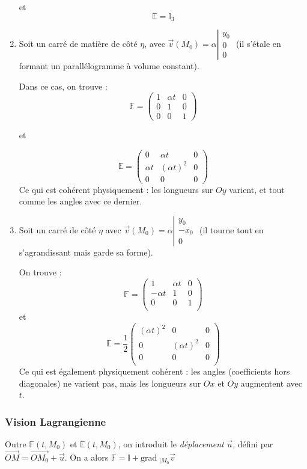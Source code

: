 \documentclass{article}
\newcommand{\grad}{\mathrm{grad}\;}
\begin{document}
\begin{enumerate}
et
\[\mathbb{E} = \mathbb{I}_3\]


\item
Soit un carré de matière de côté $\eta$, avec $\vec{v}(M_0)=\alpha \left\lvert \begin{matrix}
y_0\\0\\0
\end{matrix}\right. $ (il s'étale en formant un parallélogramme à volume constant).

Dans ce cas, on trouve : 
\[\mathbb{F} = \begin{pmatrix}
1 & \alpha t & 0\\
0 & 1 & 0\\
0 & 0 & 1
\end{pmatrix}
\]

et

\[\mathbb{E}= \begin{pmatrix}
0 & \alpha t & 0\\
\alpha t & (\alpha t)^2 & 0\\
0 & 0 & 0
\end{pmatrix}
\]
Ce qui est cohérent physiquement : les longueurs sur $Oy$ varient, et tout comme les angles avec ce dernier.

\item Soit un carré de côté $\eta$ avec $\vec{v}(M_0)=\alpha \left\lvert \begin{matrix}
y_0\\-x_0\\0
\end{matrix}\right.$ (il tourne tout en s'agrandissant mais garde sa forme).


On trouve :
\[\mathbb{F} = \begin{pmatrix}
1 & \alpha t & 0\\
-\alpha t & 1 & 0\\
0 & 0 & 1\\
\end{pmatrix}
\]
et
\[
\mathbb{E} = \dfrac{1}{2}\begin{pmatrix}
(\alpha t)^2 & 0 & 0\\
0 & (\alpha t)^2 & 0\\
0 & 0 & 0\\
\end{pmatrix}
\]
Ce qui est également physiquement cohérent : les angles (coefficients hors diagonales) ne varient pas, mais les longueurs sur $Ox$ et $Oy$ augmentent avec $t$.
\end{enumerate}

\subsubsection{Vision Lagrangienne}
Outre $\mathbb{F}(t,M_0)$ et $\mathbb{E}(t, M_0)$, on introduit le \emph{déplacement} $\vec{u}$, défini par $\overrightarrow{OM}=\overrightarrow{OM_0}+\vec{u}$. On a alors $\mathbb{F}= \mathbb{I} + \grad_{| M_0} \vec{v}$
\end{document}

